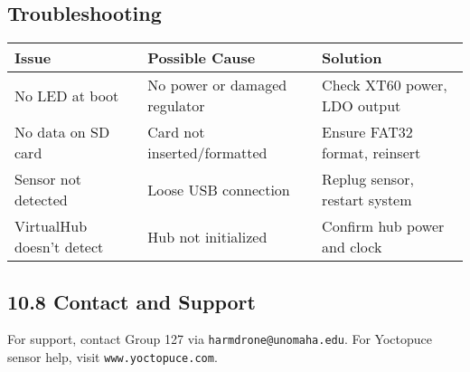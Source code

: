 \subsection*{Troubleshooting}
\begin{tabular}{|l|l|l|}
\hline
\textbf{Issue} & \textbf{Possible Cause} & \textbf{Solution} \\
\hline
No LED at boot & No power or damaged regulator & Check XT60 power, LDO output \\
\hline
No data on SD card & Card not inserted/formatted & Ensure FAT32 format, reinsert \\
\hline
Sensor not detected & Loose USB connection & Replug sensor, restart system \\
\hline
VirtualHub doesn't detect & Hub not initialized & Confirm hub power and clock \\
\hline
\end{tabular}

\subsection*{10.8 Contact and Support}
For support, contact Group 127 via \texttt{harmdrone@unomaha.edu}. For Yoctopuce sensor help, visit \texttt{www.yoctopuce.com}.

